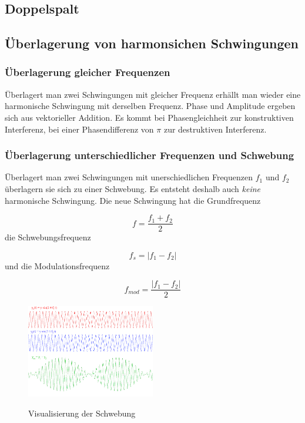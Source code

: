 \documentclass[a4paper]{article}
\begin{document}
		
		\subsection{Doppelspalt}%
	
		\subsection{Überlagerung von harmonsichen Schwingungen}
	
			\subsubsection{Überlagerung gleicher Frequenzen}
			
				Überlagert man zwei Schwingungen mit gleicher Frequenz erhällt man wieder eine harmonische Schwingung mit derselben Frequenz. Phase und Amplitude ergeben sich aus vektorieller Addition. Es kommt bei Phasengleichheit zur konstruktiven Interferenz, bei einer Phasendifferenz von $\pi$ zur destruktiven Interferenz.
			
			\subsubsection{Überlagerung unterschiedlicher Frequenzen und Schwebung}
			
				Überlagert man zwei Schwingungen mit unerschiedlichen Frequenzen $f_1$ und $f_2$ überlagern sie sich zu einer Schwebung. Es entsteht deshalb auch \textit{keine} harmonische Schwingung. Die neue Schwingung hat die Grundfrequenz
				
				\begin{equation}
					f=\frac{f_1+f_2}{2}
				\end{equation}
				die Schwebungsfrequenz
				
				\begin{equation}
					f_s=|f_1-f_2|
				\end{equation}
				und die Modulationsfrequenz
				
				\begin{equation}
				f_{mod}=\frac{|f_1-f_2|}{2}
				\end{equation}
				
				\begin{figure}[H]
					\centering
					\includegraphics[width=0.5\textwidth]{img/schwebung_k_akustwellen_gru.png}
					\label{img:schwebung_k_akustwellen_gru}
					\caption{Visualisierung der Schwebung}
				\end{figure}
			
\end{document}
